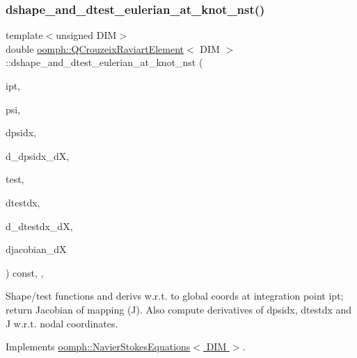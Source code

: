 \subsubsection{\texorpdfstring{dshape\+\_\+and\+\_\+dtest\+\_\+eulerian\+\_\+at\+\_\+knot\+\_\+nst()}{dshape\_and\_dtest\_eulerian\_at\_knot\_nst()}\hspace{0.1cm}{\footnotesize\ttfamily [2/4]}}
{\footnotesize\ttfamily template$<$unsigned D\+IM$>$ \\
double \hyperlink{classoomph_1_1QCrouzeixRaviartElement}{oomph\+::\+Q\+Crouzeix\+Raviart\+Element}$<$ D\+IM $>$\+::dshape\+\_\+and\+\_\+dtest\+\_\+eulerian\+\_\+at\+\_\+knot\+\_\+nst (\begin{DoxyParamCaption}\item[{const unsigned \&}]{ipt,  }\item[{\hyperlink{classoomph_1_1Shape}{Shape} \&}]{psi,  }\item[{\hyperlink{classoomph_1_1DShape}{D\+Shape} \&}]{dpsidx,  }\item[{\hyperlink{classoomph_1_1RankFourTensor}{Rank\+Four\+Tensor}$<$ double $>$ \&}]{d\+\_\+dpsidx\+\_\+dX,  }\item[{\hyperlink{classoomph_1_1Shape}{Shape} \&}]{test,  }\item[{\hyperlink{classoomph_1_1DShape}{D\+Shape} \&}]{dtestdx,  }\item[{\hyperlink{classoomph_1_1RankFourTensor}{Rank\+Four\+Tensor}$<$ double $>$ \&}]{d\+\_\+dtestdx\+\_\+dX,  }\item[{\hyperlink{classoomph_1_1DenseMatrix}{Dense\+Matrix}$<$ double $>$ \&}]{djacobian\+\_\+dX }\end{DoxyParamCaption}) const\hspace{0.3cm}{\ttfamily [inline]}, {\ttfamily [protected]}, {\ttfamily [virtual]}}



Shape/test functions and derivs w.\+r.\+t. to global coords at integration point ipt; return Jacobian of mapping (J). Also compute derivatives of dpsidx, dtestdx and J w.\+r.\+t. nodal coordinates. 



Implements \hyperlink{classoomph_1_1NavierStokesEquations_afbc63afd804f5143c74b0ca1be76ef82}{oomph\+::\+Navier\+Stokes\+Equations$<$ D\+I\+M $>$}.

\mbox{\label{classoomph_1_1QCrouzeixRaviartElement_a3984e7b6832c1794ae50cda8a48b8e75}} 
